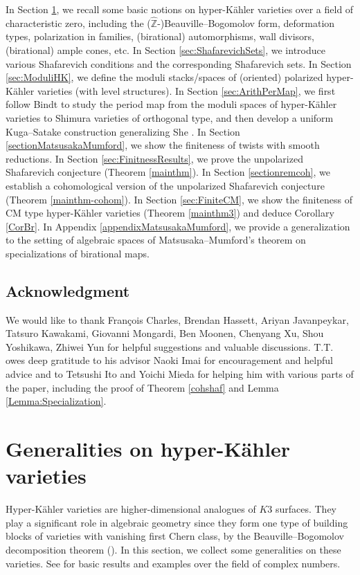 \documentclass[11pt,reqno,oneside]{amsart}
\numberwithin{equation}{section}
\theoremstyle{definition}
\newcommand{\ZZ}{\mathbb{Z}}
\begin{document}
In Section \ref{sec:HKgenerality}, we recall some basic notions on hyper-Kähler varieties over a field of characteristic zero, including the ($\widehat{\ZZ}$-)Beauville--Bogomolov form, deformation types, polarization in families, (birational) automorphisms, wall divisors, (birational) ample cones, etc. 
In Section \ref{sec:ShafarevichSets}, we introduce various Shafarevich conditions and the corresponding Shafarevich sets. 
In Section \ref{sec:ModuliHK}, we define the moduli stacks/spaces of (oriented) polarized hyper-Kähler varieties (with level structures). 
In Section \ref{sec:ArithPerMap}, we first follow Bindt \cite{BindtThesis} to study the period map from the moduli spaces of hyper-Kähler varieties to Shimura varieties of orthogonal type, and then develop a uniform Kuga--Satake construction generalizing She \cite{Sh17}. 
In Section \ref{sectionMatsusakaMumford}, we show the finiteness of twists with smooth reductions.  
In Section \ref{sec:FinitnessResults}, we prove the unpolarized Shafarevich conjecture (Theorem \ref{mainthm}). 
In Section \ref{sectionremcoh}, we establish a cohomological version of the unpolarized Shafarevich conjecture (Theorem \ref{mainthm-cohom}). 
In Section \ref{sec:FiniteCM}, we show the finiteness of CM type hyper-Kähler varieties (Theorem \ref{mainthm3}) and deduce Corollary \ref{CorBr}.
In Appendix \ref{appendixMatsusakaMumford}, we provide a generalization to the setting of algebraic spaces of Matsusaka--Mumford's theorem on specializations of birational maps.

\subsection*{Acknowledgment}  We would like to thank Fran\c{c}ois Charles, Brendan Hassett, Ariyan Javanpeykar, Tatsuro Kawakami, Giovanni Mongardi, Ben Moonen, Chenyang Xu, Shou Yoshikawa, Zhiwei Yun for helpful suggestions and valuable discussions. T.T. owes deep gratitude to his advisor Naoki Imai for encouragement and helpful advice and to Tetsushi Ito and Yoichi Mieda for helping him with various parts of the paper, including the proof of Theorem \ref{cohshaf} and Lemma \ref{Lemma:Specialization}. 

\section{Generalities on hyper-Kähler varieties}
\label{sec:HKgenerality}
Hyper-Kähler varieties are higher-dimensional analogues of
$K3$ surfaces. They play a significant role in algebraic geometry since they form one type of building blocks of varieties with vanishing first Chern class, by the Beauville--Bogomolov decomposition theorem (\cite{Bea83, Bogomolov74}). 
In this section, we collect some generalities on these varieties. See \cite{Bea83, MR1664696, MR1963559} for basic results and examples over the field of complex numbers.
\end{document}
